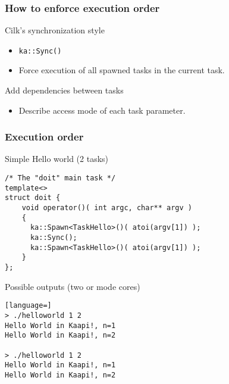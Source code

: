 \begin{frame}[fragile]
  \frametitle{How to enforce execution order}
  \begin{exampleblock}{Cilk's synchronization style}
    \begin{itemize}
    \item \verb+ka::Sync()+
    \item Force execution of all spawned tasks in the current task.
    \end{itemize}
  \end{exampleblock}
  \pause
  \begin{exampleblock}{Add dependencies between tasks}
    \begin{itemize}
    \item Describe \alert{access mode} of each task parameter.
    \end{itemize}
  \end{exampleblock}
\end{frame}
\begin{frame}[fragile]
  \frametitle{Execution order}
\begin{block}{Simple Hello world (2 tasks)}
\begin{lstlisting}
/* The "doit" main task */
template<>
struct doit {
    void operator()( int argc, char** argv )
    {
      ka::Spawn<TaskHello>()( atoi(argv[1]) );
      ka::Sync();
      ka::Spawn<TaskHello>()( atoi(argv[1]) );
    }
};
\end{lstlisting}
\end{block}
%
\pause
%
\begin{block}{Possible outputs (two or mode cores)}
\begin{lstlisting}[language=]
> ./helloworld 1 2 
Hello World in Kaapi!, n=1
Hello World in Kaapi!, n=2

> ./helloworld 1 2 
Hello World in Kaapi!, n=1
Hello World in Kaapi!, n=2
\end{lstlisting}
\end{block}
%
%
\end{frame}
